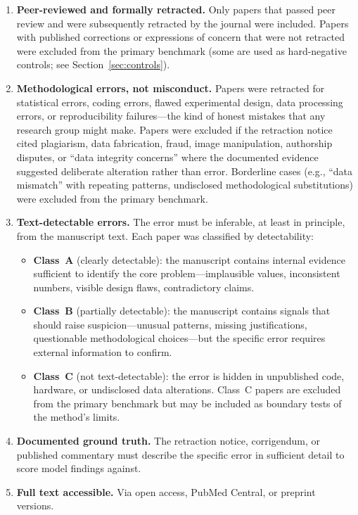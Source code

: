 \documentclass[11pt]{article}
\begin{document}
\begin{enumerate}
\item \textbf{Peer-reviewed and formally retracted.} Only papers that passed peer review and were subsequently retracted by the journal were included. Papers with published corrections or expressions of concern that were not retracted were excluded from the primary benchmark (some are used as hard-negative controls; see Section~\ref{sec:controls}).
\item \textbf{Methodological errors, not misconduct.} Papers were retracted for statistical errors, coding errors, flawed experimental design, data processing errors, or reproducibility failures---the kind of honest mistakes that any research group might make. Papers were excluded if the retraction notice cited plagiarism, data fabrication, fraud, image manipulation, authorship disputes, or ``data integrity concerns'' where the documented evidence suggested deliberate alteration rather than error. Borderline cases (e.g., ``data mismatch'' with repeating patterns, undisclosed methodological substitutions) were excluded from the primary benchmark.
\item \textbf{Text-detectable errors.} The error must be inferable, at least in principle, from the manuscript text. Each paper was classified by detectability:
\begin{itemize}
\item \textbf{Class~A} (clearly detectable): the manuscript contains internal evidence sufficient to identify the core problem---implausible values, inconsistent numbers, visible design flaws, contradictory claims.
\item \textbf{Class~B} (partially detectable): the manuscript contains signals that should raise suspicion---unusual patterns, missing justifications, questionable methodological choices---but the specific error requires external information to confirm.
\item \textbf{Class~C} (not text-detectable): the error is hidden in unpublished code, hardware, or undisclosed data alterations. Class~C papers are excluded from the primary benchmark but may be included as boundary tests of the method's limits.
\end{itemize}
\item \textbf{Documented ground truth.} The retraction notice, corrigendum, or published commentary must describe the specific error in sufficient detail to score model findings against.
\item \textbf{Full text accessible.} Via open access, PubMed Central, or preprint versions.
\end{enumerate}
\end{document}
